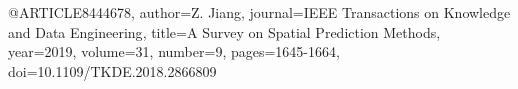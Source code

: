 @ARTICLE{8444678,
  author={Z. {Jiang}},
  journal={IEEE Transactions on Knowledge and Data Engineering}, 
  title={A Survey on Spatial Prediction Methods}, 
  year={2019},
  volume={31},
  number={9},
  pages={1645-1664},
  doi={10.1109/TKDE.2018.2866809}}